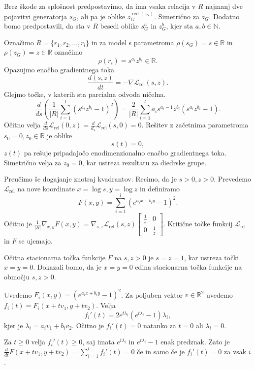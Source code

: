 \documentclass[mat2, tisk]{fmfdelo}
\newcommand{\R}{\mathbb R}
\newcommand{\N}{\mathbb N}
\newcommand{\Loss}[1]{\mathcal L _\text{#1}}
\begin{document}
Brez škode za splošnost predpostavimo, da ima vsaka
relacija v $R$ najmanj dve pojavitvi generatorja $s_G$, ali pa je
oblike $z_G^{\operatorname{red}(z_G)}$. Simetrično za
$z_G$. Dodatno bomo predpostavili, da sta  v $R$
besedi oblike $s_G ^a$ in $z_G^b$, kjer sta
$a, b\in \N$.

Označimo
$R= \{ r_1, r_2, \dotsc, r_l\}$ in za model s parametroma
$\rho(s_G) = s \in \R$ in $\rho(z_G) = z \in \R$ označimo
$$
\rho(r_i) = s^{a_i} z^{b_i}  \in \R.
$$
Opazujmo enačbo gradientnega toka
$$
\frac{d(s,z)}{dt} = -\nabla \Loss{rel}(s,z).
$$
Glejmo točke, v katerih sta parcialna odvoda ničelna.
$$
\frac{d}{ds} (\frac{1}{|R|} \sum_{i=1}^l (s^{a_i} z^{b_i} - 1)^2) =
\frac{2}{|R|} \sum_{i=1}^l a_i s^{a_i -1} z^{b_i} (s^{a_i}
z^{b_i} - 1).
$$
%
Očitno velja $\frac{d}{ds}\Loss{rel}(0,z) =
\frac{d}{d_z}\Loss{rel}(s,0) = 0  $.
Rešitev z začetnima parametroma $s_0 = 0, z_0 \in \R$ je oblike
$$
s(t) = 0,
$$
$z(t)$ pa rešuje pripadajočo enodimenzionalno enačbo gradientnega toka.
Simetrično velja za $z_0 = 0$, kar ustreza rezultatu za diedrske grupe.

Preučimo še dogajanje znotraj kvadrantov. Recimo, da je
$s>0, z>0$. Prevedemo $\Loss{rel}$ na nove koordinate $x = \log s,
y = \log z$ in definiramo
$$
F(x,y) =  \sum_{i=1}^l (e^{a_ix + b_iy} -1)^2.
$$
Očitno je $\frac{1}{|R|}\nabla_{x,y} F(x,y) = \nabla_{s,z}
\Loss{rel}(s,z)
\begin{bmatrix}
  \frac{1}{s} & 0 \\
  0 & \frac{1}{z}
\end{bmatrix}$. Kritične točke funkcij $\Loss{rel}$ in $F$ se ujemajo.

Očitna stacionarna točka funkcije $F$ na $s, z > 0$ je $s=z=1$, kar ustreza
točki $x=y=0$. Dokazali bomo, da je $x=y=0$ edina stacionarna
točka funkcije na območju $s, z >0$.

Uvedemo $F_i(x,y) = (e^{a_ix + b_iy} -1)^2$.
Za poljuben vektor
$v \in \R^2$ uvedemo
$f_i(t) = F_i(x + t v_1, y + t v_2)$. Velja
$$
f_i'(t) = 2e^{t \lambda_i} (e^{t \lambda_i} -1) \lambda_i,
$$
kjer je $\lambda_i = a_iv_1 + b_iv_2$. Očitno je $f_i'(t) = 0$
natanko za $t=0$ ali $\lambda_i=0$.

Za $t\geq 0$ velja $f_i'(t) \geq 0$, saj imata
$e^{t \lambda_i}$ in $e^{t \lambda_i} -1$ enak predznak.
Zato je
$
\frac{d}{dt}F(x + tv_1, y + t v_2) = \sum_{i=1}^l f_i'(t) = 0
$
če in samo če je $f_i'(t) = 0$ za vsak $i$.
\end{document}
